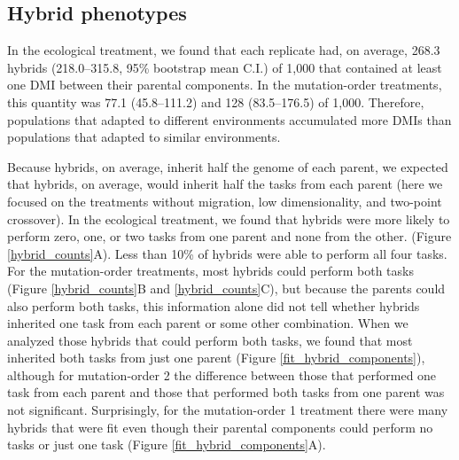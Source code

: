 \begin{doublespace}

%


\subsection{Hybrid phenotypes}

In the ecological treatment,
we found that each replicate had, on average,
268.3 hybrids (218.0--315.8, 95\% bootstrap mean C.I.) of 1,000
that contained at least one DMI between their parental components.
%
In the mutation-order treatments,
this quantity was 77.1 (45.8--111.2) and 128 (83.5--176.5) of 1,000.
%
Therefore, populations that adapted to different environments
accumulated more DMIs than populations that adapted to similar environments.



Because hybrids, on average, inherit half the genome of each parent,
we expected that hybrids, on average, would inherit half the tasks
from each parent (here we focused on the treatments without migration,
low dimensionality, and two-point crossover).
%
In the ecological treatment, we found that hybrids were more likely to perform
zero, one, or two tasks from one parent and none from the other.
(Figure \ref{hybrid_counts}A).
%
Less than 10\% of hybrids were able to perform all four tasks.
%
For the mutation-order treatments,
most hybrids could perform both tasks
(Figure \ref{hybrid_counts}B and \ref{hybrid_counts}C),
but because the parents could also perform both tasks,
this information alone did not tell whether hybrids inherited
one task from each parent or some other combination.
%
When we analyzed those hybrids that could perform both tasks,
we found that most inherited both tasks from just one parent
(Figure \ref{fit_hybrid_components}),
although for mutation-order 2
the difference between those
that performed one task from each parent
and those that performed both tasks from one parent
was not significant.
%
Surprisingly, for the mutation-order 1 treatment
there were many hybrids that were fit
even though their parental components
could perform no tasks or just one task
(Figure \ref{fit_hybrid_components}A).


\end{doublespace}
